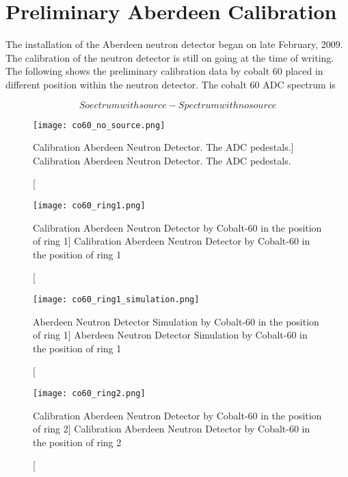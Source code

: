 \section {Preliminary Aberdeen Calibration}

The installation of the Aberdeen neutron detector began on late February, 2009.
The calibration of the neutron detector is still on going at the time of writing.
The following shows the preliminary calibration data by cobalt 60 placed in different
position within the neutron detector. The cobalt 60 ADC spectrum is


\begin{equation}
\label{equ:co60Spectrum}
Soectrum with source - Spectrum with no source
\end{equation}


\begin{figure}
    \centering
    \texttt{[image: co60\_no\_source.png]}
    \caption
    [Calibration Aberdeen Neutron Detector. The ADC pedestals.]
    {Calibration Aberdeen Neutron Detector. The ADC pedestals.}
    \label{fig:co60_no_source.png}
    \end{figure}


\begin{figure}
    \centering
    \texttt{[image: co60\_ring1.png]}
    \caption
    [Calibration Aberdeen Neutron Detector by Cobalt-60 in the position of ring 1]
    {Calibration Aberdeen Neutron Detector by Cobalt-60 in the position of ring 1}
    \label{fig:co60_ring1.png}
    \end{figure}


\begin{figure}
    \centering
    \texttt{[image: co60\_ring1\_simulation.png]}
    \caption
    [Aberdeen Neutron Detector Simulation by Cobalt-60 in the position of ring 1]
    {Aberdeen Neutron Detector Simulation by Cobalt-60 in the position of ring 1}
    \label{fig:co60_ring1_simulation}
    \end{figure}





\begin{figure}
    \centering
    \texttt{[image: co60\_ring2.png]}
    \caption
    [Calibration Aberdeen Neutron Detector by Cobalt-60 in the position of ring 2]
    {Calibration Aberdeen Neutron Detector by Cobalt-60 in the position of ring 2}
    \label{fig:co60_ring2.png}
    \end{figure}


